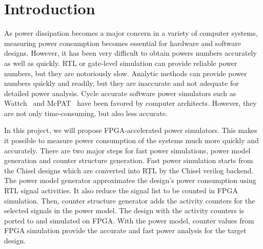 \section{Introduction}

As power dissipation becomes a major concern in a variety of computer systems, measuring power consumption becomes essential for hardware and software designs. 
However, it has been very difficult to obtain powers numbers accurately as well as quickly. 
RTL or gate-level simulation can provide reliable power numbers, but they are notoriously slow. 
Analytic methods can provide power numbers quickly and readily, but they are inaccurate and not adequate for detailed power analysis. 
Cycle accurate software power simulators such as Wattch~\cite{Wattch} and McPAT~\cite{McPat} have been favored by computer architects. 
However, they are not only time-consuming, but also less accurate.

In this project, we will propose FPGA-accelerated power simulators.  
This makes it possible to measure power consumption of the systems much more quickly and accurately. 
There are two major steps for fast power simulations, power model generation and counter structure generation. 
Fast power simulation starts from the Chisel designs which are converted into RTL by the Chisel verilog backend.
The power model generator approximates the design's power consumption using RTL signal activities.
It also reduce the signal list to be counted in FPGA simulation.
Then, counter structure generator adds the activity counters for the selected signals in the power model.
The design with the activity counters is ported to and simulated on FPGA.
With the power model, counter values from FPGA simulation provide the accurate and fast power analysis for the target design.
